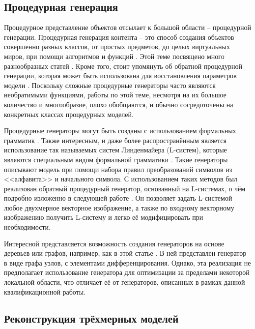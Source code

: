 \documentclass[a4paper,hidelinks,12pt]{article}
\begin{document}
\subsection{Процедурная генерация}

\par
Процедурное представление объектов отсылает к большой области – процедурной генерации. Процедурная генерация контента – это способ создания объектов совершенно разных классов, от простых предметов, до целых виртуальных миров, при помощи алгоритмов и функций \cite{hendrikx2013procedural} \cite{freiknecht2017survey}. Этой теме посвящено много разнообразных статей \cite{viana2019survey} \cite{de2011survey}. Кроме того, стоит упомянуть об обратной процедурной генерации, которая может быть использована для восстановления параметров модели \cite{stava2014inverse} \cite{guo2020inverse} \cite{garifullin2022fitting} \cite{garifullin2023diff} \cite{garifullin2024single}. Поскольку сложные процедурные генераторы часто являются необратимыми функциями, работы по этой теме, несмотря на их большое количество и многообразие, плохо обобщаются, и обычно сосредоточены на конкретных классах процедурных моделей.
\par
Процедурные генераторы могут быть созданы с использованием формальных грамматик \cite{urban1} \cite{sportelli2014probabilistic}. Также интересным, и даже более распространённым является использование так называемых систем Линденмайера (L-систем), которые являются специальным видом формальной грамматики \cite{marvie2005fl} \cite{guo2020inverse}. Такие генераторы описывают модель при помощи набора правил преобразований символов из <<алфавита>> и начального символа. С использованием таких методов был реализован обратный процедурный генератор, основанный на L-системах, о чём подробно изложенно в следующей работе \cite{vst2010inverse}. Он позволяет задать L-системой любое двухмерное векторное изображение, а также по входному векторному изображению получить L-систему и легко её модифицировать при необходимости.
\par
Интересной представляется возможность создания генераторов на основе деревьев или графов, например, как в этой статье \cite{gaillard2022automatic}. В ней представлен генератор в виде графа узлов, с элементами дифференцирования. Однако, эта реализация не предполагает использование генератора для оптимизации за пределами некоторой локальной области, что отличает её от генераторов, описанных в рамках данной квалификационной работы. 

\subsection{Реконструкция трёхмерных моделей}
\end{document}
